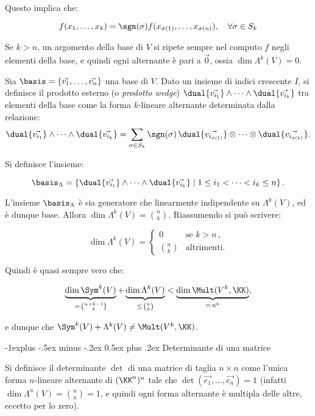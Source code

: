 \documentclass[10pt,landscape]{article}
\makeatletter
\renewcommand{\subsection}{\@startsection{subsection}{2}{0mm}%
	{-1explus -.5ex minus -.2ex}%
	{0.5ex plus .2ex}%
	{\normalfont\normalsize\bfseries}}
\makeatother
\begin{document}
\begin{multicols}{3}
		\vskip 0.05in
		
		Questo implica che:
		
		\[ f(x_1, \ldots, x_k) = \sgn(\sigma) f(x_{\sigma(1)}, \ldots, x_{\sigma(n)}), \quad \forall \sigma \in S_k \]
		
		Se $k > n$, un argomento della base di $V$ si ripete sempre nel
		computo $f$ negli elementi della base, e quindi ogni alternante è
		pari a $\vec{0}$, ossia $\dim \Lambda^k(V) = 0$.
		
		Sia $\basis = \{\vec{v_1}, \ldots, \vec{v_n}\}$ una base
		di $V$. Dato un insieme di indici crescente $I$,
		si definisce il prodotto esterno (o \textit{prodotto wedge}) 
		$\dual{\vec{v_{i_1}}} \wedge \cdots \wedge \dual{\vec{v_{i_k}}}$
		tra elementi della base come la forma $k$-lineare alternante
		determinata dalla relazione:
		\[ \dual{\vec{v_{i_1}}} \wedge \cdots \wedge \dual{\vec{v_{i_k}}} = \sum_{\sigma \in S_k} \sgn(\sigma) \, \dual{\vec{v_{i_{\sigma(1)}}}} \otimes \cdots \otimes \dual{\vec{v_{i_{\sigma(k)}}}}. \]
		
		Si definisce l'insieme:
		
		\[\basis_{\Lambda} = \left\{  \dual{\vec{v_{i_1}}} \wedge \cdots \wedge \dual{\vec{v_{i_k}}} \mid 1 \leq i_1 < \cdots < i_k \leq n \right\}. \]
		
		L'insieme $\basis_{\Lambda}$ è sia generatore che linearmente
		indipendente su $\Lambda^k(V)$, ed è dunque base. Allora
		$\dim \Lambda^k(V) = \binom{n}{k}$. Riassumendo si può scrivere:
		
		\[\dim \Lambda^k(V) = \begin{cases} 0 & \text{se } k > n\,, \\ \binom{n}{k} & \text{altrimenti}. \end{cases}\]
		
		Quindi è quasi sempre vero che:
		
		\[ \underbrace{\dim \Sym^k(V)}_{= \, \binom{n+k-1}{k}} + \underbrace{\dim \Lambda^k(V)}_{\leq \, \binom{n}{k}} < \underbrace{\dim \Mult(V^k, \KK)}_{=\,n^k}, \]
		
		e dunque che $\Sym^k(V) + \Lambda^k(V) \neq \Mult(V^k, \KK)$.
		
		
		
		\subsection{Determinante di una matrice}
		
		Si definisce il determinante $\det$ di una matrice di taglia
		$n \times n$ come l'unica forma $n$-lineare alternante di $(\KK^n)^n$
		tale che $\det(\vec{e_1}, \ldots, \vec{e_n}) = 1$ (infatti
		$\dim \Lambda^n (V) = \binom{n}{n} = 1$, e quindi ogni forma
		alternante è multipla delle altre, eccetto per lo zero).
		

\end{multicols}
\end{document}
